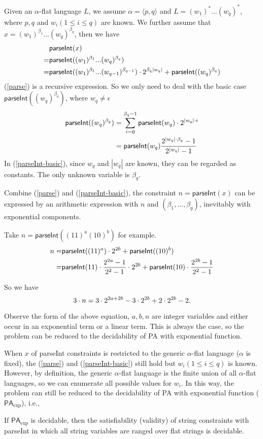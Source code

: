\documentclass[runningheads]{llncs}
\newcommand{\parseInt}{\textsf{parseInt}}
\newcommand{\paexp}{$\textsf{PA}_{\exp}$}
\begin{document}
Given an $\alpha$-flat language $L$,
we assume $\alpha=\langle p,q \rangle$ and $L=(w_1)^*...(w_q)^*$,
where $p,q$ and $w_i(1\le i \le q) $ are known.
We further assume that $x = (w_1)^{\beta_1} ... (w_q)^{\beta_q}$,
then we have
\begin{align}
    &{\parseInt}(x) \notag \\
    =&{\parseInt}((w_1)^{\beta_1} ... (w_q)^{\beta_q}) \notag \\
    =&{\parseInt}((w_1)^{\beta_1} ... (w_{q-1})^{\beta_{q-1}})\cdot 2^{\beta_q |w_q|}
    + {\parseInt}((w_q)^{\beta_q}) \label{parse}
\end{align}
(\ref{parse}) is a recursive expression.
So we only need to deal with the basic case ${\parseInt}((w_q)^{\beta_q})$, 
where $w_q \neq \epsilon$
\begin{align}
    {\parseInt}((w_q)^{\beta_q}) &= \sum_{i=0}^{\beta_q-1} {\parseInt}(w_q)\cdot 2^{|w_q|\cdot i}  \notag \\
    &={\parseInt}(w_q)\frac{2^{|w_q|\cdot \beta_q}-1}{2^{|w_q|}-1}
    \label{parseInt-basic}
\end{align}
In (\ref{parseInt-basic}), since $w_q$ and $|w_q|$ are known, 
they can be regarded as constants.
The only unknown variable is $\beta_q$.

Combine (\ref{parse}) and (\ref{parseInt-basic}),
the constraint $n={\parseInt}(x)$ can be expressed by an arithmetic expression with 
$n$ and $(\beta_1,...,\beta_q)$,
inevitably with exponential components.

Take $n={\parseInt}((11)^a(10)^b)$ for example.
\begin{align}
    n=& {\parseInt}((11)^a)\cdot 2^{2b} + {\parseInt}((10)^b) \notag \\
    =& {\parseInt}(11)\cdot \frac{2^{2a}-1}{2^2-1}\cdot 2^{2b} + 
    {\parseInt}(10) \cdot \frac{2^{2b}-1}{2^2-1} \notag 
\end{align}

So we have 
\begin{equation}
    3\cdot n = 3\cdot 2^{2a+2b}-3\cdot 2^{2b}+2\cdot 2^{2b}-2. \notag
\end{equation}

Observe the form of the above equation,
$a,b,n$ are integer variables and either occur in 
an exponential term or a linear term.
This is always the case,
so the problem can be reduced to 
the decidability of PA with exponential function.

When $x$ of {\parseInt} constraints is restricted to the
generic $\alpha$-flat language ($\alpha$ is fixed),
the (\ref{parse}) and (\ref{parseInt-basic}) still hold 
but $w_i(1\le i\le q)$ is known.
However,
by definition,
the generic $\alpha$-flat language is the finite union of all $\alpha$-flat languages,
so we can enumerate all possible values for $w_i$.
In this way,
the problem can still be reduced to the decidability of PA with exponential function (\paexp), i.e.,
\begin{theorem} \label{thm:string-parInt}
If {\paexp} is decidable, then the satisfiability (validity) of string constraints with {\parseInt} in which all string variables 
are ranged over flat strings is decidable. 
\end{theorem}
\end{document}
